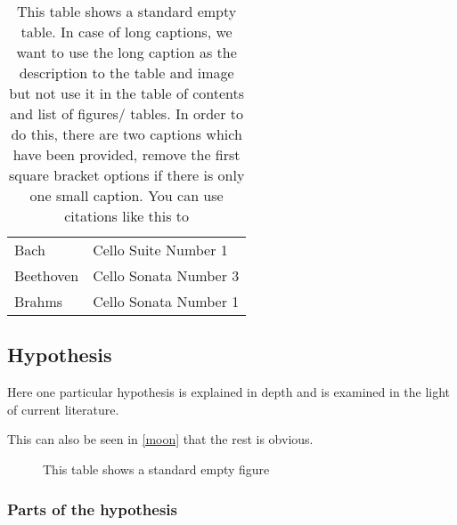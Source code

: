 \begin{table}[h!tb] \centering
    \caption[This table shows a standard non-empty table. Please check the code caption for extended instructions]{This table shows a standard empty table. In case of long captions, we want to use the long caption as the description to the table and image but not use it in the table of contents and list of figures/ tables. In order to do this, there are two captions which have been provided, remove the first square bracket options if there is only one small caption. You can use citations like this to}

    \begin{tabular}{ll}
        Bach      & Cello Suite Number 1  \\
        Beethoven & Cello Sonata Number 3 \\
        Brahms    & Cello Sonata Number 1
    \end{tabular}
    \label{nothing}

    \vspace{ 2 in}
\end{table}

\subsection{Hypothesis}

Here one particular hypothesis is explained in depth
and is examined in the light of current literature.

This can also be seen in \autoref{moon} that the
rest is obvious.

\begin{figure}[h!tb] \centering

    \vspace{ 2 in}
    \caption{This table shows a standard empty figure}
    \label{moon}
\end{figure}

\subsubsection{Parts of the hypothesis}

